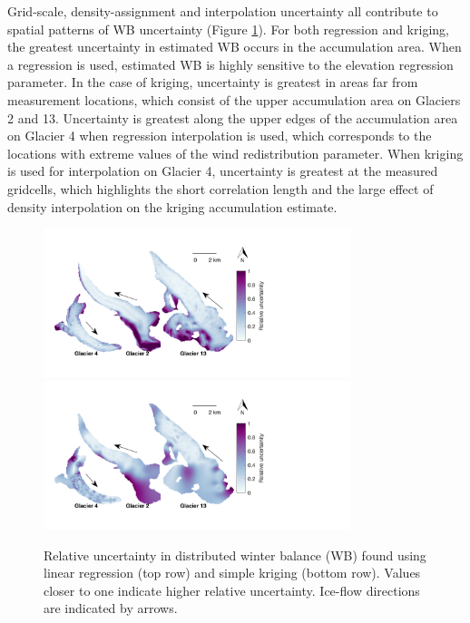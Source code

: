 \documentclass{sfuthesis}
\begin{document}
Grid-scale, density-assignment and interpolation uncertainty all contribute to spatial patterns of WB uncertainty (Figure \ref{fig:WSMBspatialvar}).  For both regression and kriging, the greatest uncertainty in estimated WB occurs in the accumulation area. When a regression is used, estimated WB is highly sensitive to the elevation regression parameter. In the case of kriging, uncertainty is greatest in areas far from measurement locations, which consist of the upper accumulation area on Glaciers 2 and 13. Uncertainty is greatest along the upper edges of the accumulation area on Glacier 4 when regression interpolation is used, which corresponds to the locations with extreme values of the wind redistribution parameter. When kriging is used for interpolation on Glacier 4, uncertainty is greatest at the measured gridcells, which highlights the short correlation length and the large effect of density interpolation on the kriging accumulation estimate.

\begin{figure}
	\centering
	\includegraphics[width =0.8\textwidth]{SpatialVar_LR.pdf}\\
	\includegraphics[width =0.8\textwidth]{SpatialVar_SK.pdf}\\
	\caption{Relative uncertainty in distributed winter balance (WB) found using linear regression (top row) and simple kriging (bottom row). Values closer to one indicate higher relative uncertainty. Ice-flow directions are indicated by arrows.}
	\label{fig:WSMBspatialvar}
\end{figure}
\end{document}
